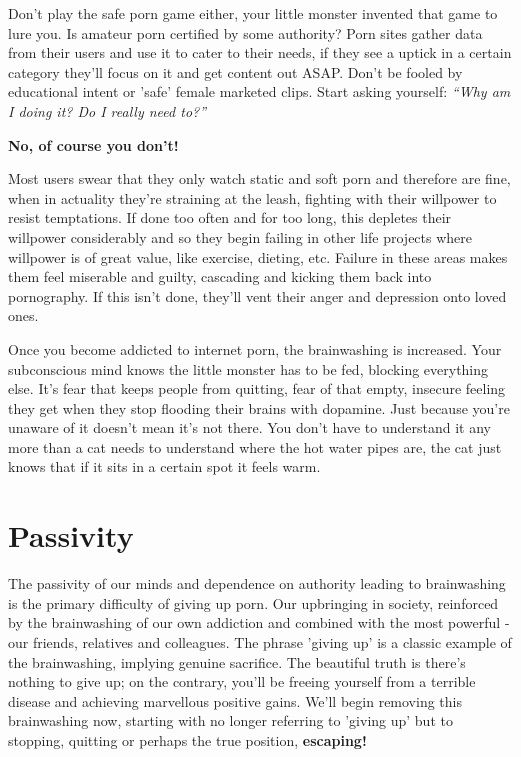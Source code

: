 \documentclass[
]{book}
\begin{document}
Don't play the safe porn game either, your little monster invented that game to lure you. Is amateur porn certified by some authority? Porn sites gather data from their users and use it to cater to their needs, if they see a uptick in a certain category they'll focus on it and get content out ASAP. Don't be fooled by educational intent or 'safe' female marketed clips. Start asking yourself: \emph{``Why am I doing it? Do I really need to?''}

\textbf{No, of course you don't!}

Most users swear that they only watch static and soft porn and therefore are fine, when in actuality they're straining at the leash, fighting with their willpower to resist temptations. If done too often and for too long, this depletes their willpower considerably and so they begin failing in other life projects where willpower is of great value, like exercise, dieting, etc. Failure in these areas makes them feel miserable and guilty, cascading and kicking them back into pornography. If this isn't done, they'll vent their anger and depression onto loved ones.

Once you become addicted to internet porn, the brainwashing is increased. Your subconscious mind knows the little monster has to be fed, blocking everything else. It's fear that keeps people from quitting, fear of that empty, insecure feeling they get when they stop flooding their brains with dopamine. Just because you're unaware of it doesn't mean it's not there. You don't have to understand it any more than a cat needs to understand where the hot water pipes are, the cat just knows that if it sits in a certain spot it feels warm.

\hypertarget{passivity}{%
\section{Passivity}\label{passivity}}

The passivity of our minds and dependence on authority leading to brainwashing is the primary difficulty of giving up porn. Our upbringing in society, reinforced by the brainwashing of our own addiction and combined with the most powerful - our friends, relatives and colleagues. The phrase 'giving up' is a classic example of the brainwashing, implying genuine sacrifice. The beautiful truth is there's nothing to give up; on the contrary, you'll be freeing yourself from a terrible disease and achieving marvellous positive gains. We'll begin removing this brainwashing now, starting with no longer referring to 'giving up' but to stopping, quitting or perhaps the true position, \textbf{escaping!}
\end{document}
